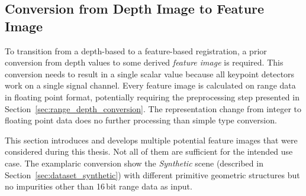 \subsection{Conversion from Depth Image to Feature Image}\label{sec:feature_images}

To transition from a depth-based to a feature-based registration, a prior conversion from depth values to some derived \emph{feature image} is required.
This conversion needs to result in a single scalar value because all keypoint detectors work on a single signal channel.
Every feature image is calculated on range data in floating point format, potentially requiring the preprocessing step presented in Section~\ref{sec:range_depth_conversion}.
The representation change from integer to floating point data does no further processing than simple type conversion.

This section introduces and develops multiple potential feature images that were considered during this thesis.
Not all of them are sufficient for the intended use case.
The examplaric conversion show the \emph{Synthetic} scene (described in Section~\ref{sec:dataset_synthetic}) with different primitive geometric structures but no impurities other than 16\,bit range data as input.






